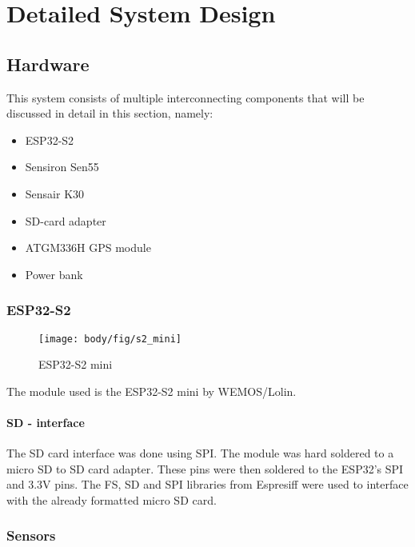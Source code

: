 \chapter{Detailed System Design}
\vspace{-2em}
\section{Hardware}


This system consists of multiple interconnecting components that will be discussed in detail in this section, namely:
\begin{itemize}
	\item ESP32-S2
	\item Sensiron Sen55
	\item Sensair K30
	\item SD-card adapter
	\item ATGM336H GPS module
	\item Power bank	
\end{itemize} 




\subsection{ESP32-S2}
\begin{figure}[!htb]
	\centering
	\texttt{[image: body/fig/s2\_mini]}
	\caption{ESP32-S2 mini}
	\label{fig:s2mini}
\end{figure}



The module used is the ESP32-S2 mini by WEMOS/Lolin. 
\subsubsection{SD - interface}
The SD card interface was done using SPI. The module was hard soldered to a micro SD to SD card adapter. These pins were then soldered to the ESP32's SPI and 3.3V pins.
The FS, SD and SPI libraries from Espresiff were used to interface with the already formatted micro SD card.




\subsection{Sensors}
